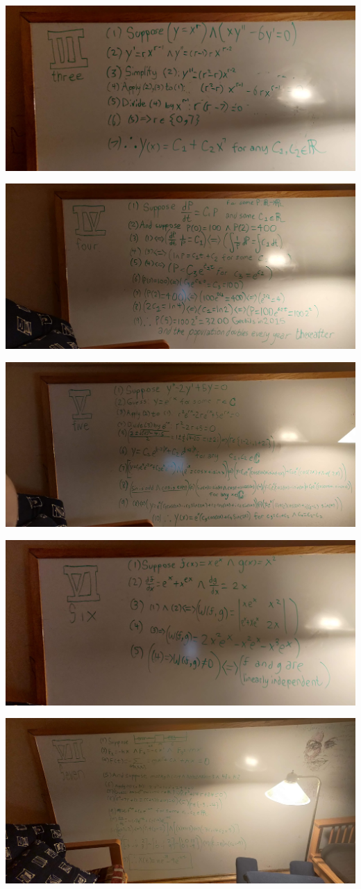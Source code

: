 \documentclass[12pt]{article}
\begin{document}
\includegraphics[scale=0.075]{3.jpg}

\includegraphics[scale=0.075]{4.jpg}

\includegraphics[scale=0.075]{5.jpg}

\includegraphics[scale=0.075]{6.jpg}

\includegraphics[scale=0.075]{7.jpg}
\end{document}
